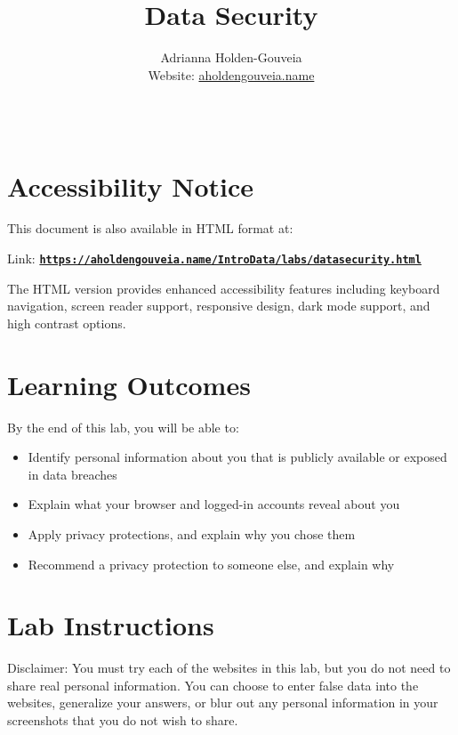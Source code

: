 \documentclass[12pt]{article}
\title{Data Security}
\author{
        Adrianna Holden-Gouveia \\
        Website: \href{https://aholdengouveia.name}{aholdengouveia.name}\\ 
        \date{\vspace{-5ex}}
        \faGithub {: aholdengouveia} \\
        }
\begin{document}
    

\maketitle



\section*{Accessibility Notice}
This document is also available in HTML format at:

Link: \href{https://aholdengouveia.name/IntroData/labs/datasecurity.html}{\textbf{\nolinkurl{https://aholdengouveia.name/IntroData/labs/datasecurity.html}}}

The HTML version provides enhanced accessibility features including keyboard navigation, screen reader support, responsive design, dark mode support, and high contrast options.

\section*{Learning Outcomes}
By the end of this lab, you will be able to:
\begin{itemize}
    \item Identify personal information about you that is publicly available or exposed in data breaches
    \item Explain what your browser and logged-in accounts reveal about you
    \item Apply privacy protections, and explain why you chose them
    \item Recommend a privacy protection to someone else, and explain why
\end{itemize}

\section*{Lab Instructions}


Disclaimer: You must try each of the websites in this lab, but you do not need to share real personal information. You can choose to enter false data into the websites, generalize your answers, or blur out any personal information in your screenshots that you do not wish to share.
\end{document}
